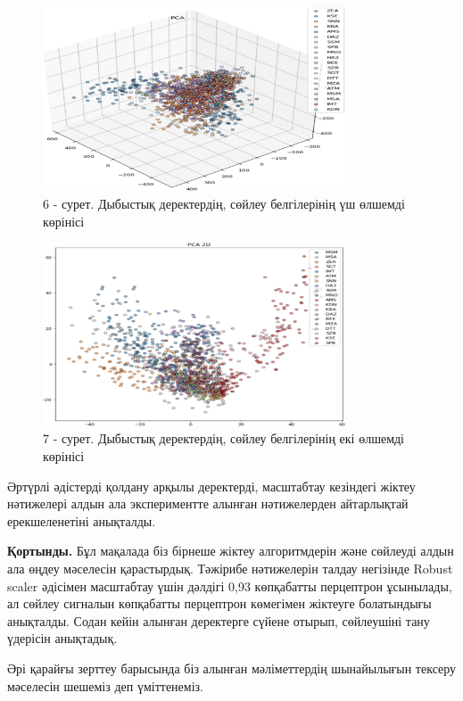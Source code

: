 \begin{figure}[H]
	\centering
	\includegraphics[width=0.8\textwidth]{media/ict/image11}
	\caption*{6 - сурет. Дыбыстық деректердің, сөйлеу белгілерінің үш өлшемді көрінісі}
\end{figure}

\begin{figure}[H]
	\centering
	\includegraphics[width=0.8\textwidth]{media/ict/image12}
	\caption*{7 - сурет. Дыбыстық деректердің, сөйлеу белгілерінің екі өлшемді көрінісі}
\end{figure}

\begin{multicols}{2}
Әртүрлі әдістерді қолдану арқылы деректерді, масштабтау кезіндегі жіктеу
нәтижелері алдын ала экспериментте алынған нәтижелерден айтарлықтай
ерекшеленетіні анықталды.

{\bfseries Қортынды.} Бұл мақалада біз бірнеше жіктеу алгоритмдерін және
сөйлеуді алдын ала өңдеу мәселесін қарастырдық. Тәжірибе нәтижелерін
талдау негізінде Robust scaler әдісімен масштабтау үшін дәлдігі 0,93
көпқабатты перцептрон ұсынылады, ал сөйлеу сигналын көпқабатты
перцептрон көмегімен жіктеуге болатындығы анықталды. Содан кейін алынған
деректерге сүйене отырып, сөйлеушіні тану үдерісін анықтадық.

Әрі қарайғы зерттеу барысында біз алынған мәліметтердің шынайылығын
тексеру мәселесін шешеміз деп үміттенеміз.
\end{multicols}


